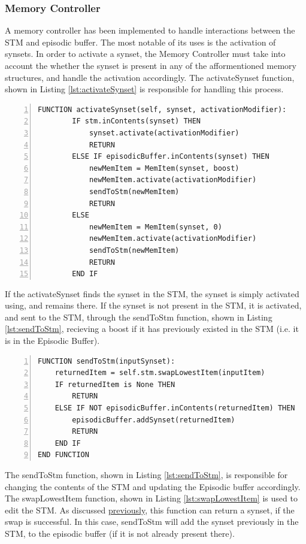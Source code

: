 \documentclass[]{article}
\begin{document}
\subsubsection{Memory Controller}
\label{sec:ImplementedMemoryController}

A memory controller has been implemented to handle interactions between the STM and episodic buffer. The most notable of its uses is the activation of synsets. In order to activate a synset, the Memory Controller must take into account the whether the synset is present in any of the afformentioned memory structures, and handle the activation accordingly. The activateSynset function, shown in Listing \ref{lst:activateSynset} is responsible for handling this process.

\begin{lstlisting}[numbers=left, numberstyle=\small, caption={the activateSynset function}, captionpos=b, label={lst:activateSynset}]
FUNCTION activateSynset(self, synset, activationModifier):
        IF stm.inContents(synset) THEN
            synset.activate(activationModifier)
            RETURN
        ELSE IF episodicBuffer.inContents(synset) THEN
            newMemItem = MemItem(synset, boost)
            newMemItem.activate(activationModifier)
            sendToStm(newMemItem)
            RETURN
        ELSE
            newMemItem = MemItem(synset, 0)
            newMemItem.activate(activationModifier)
            sendToStm(newMemItem)
            RETURN
        END IF
\end{lstlisting}

If the activateSynset finds the synset in the STM, the synset is simply activated using, and remains there. If the synset is not present in the STM, it is activated, and sent to the STM, through the sendToStm function, shown in Listing \ref{lst:sendToStm}, recieving a boost if it has previously existed in the STM (i.e. it is in the Episodic Buffer).

\begin{lstlisting}[numbers=left, numberstyle=\small, caption={the sendToStm function}, captionpos=b, label={lst:sendToStm}]
FUNCTION sendToStm(inputSynset):
	returnedItem = self.stm.swapLowestItem(inputItem)
    IF returnedItem is None THEN
        RETURN
    ELSE IF NOT episodicBuffer.inContents(returnedItem) THEN
        episodicBuffer.addSynset(returnedItem)
        RETURN
    END IF
END FUNCTION
\end{lstlisting}

The sendToStm function, shown in Listing \ref{lst:sendToStm}, is responsible for changing the contents of the STM and updating the Episodic buffer accordingly. The swapLowestItem function, shown in Listing \ref{lst:swapLowestItem} is used to edit the STM. As discussed \hyperref[sec:ImplementedSTM]{previously}, this function can return a synset, if the swap is successful. In this case, sendToStm will add the synset previously in the STM, to the episodic buffer (if it is not already present there).
\end{document}
